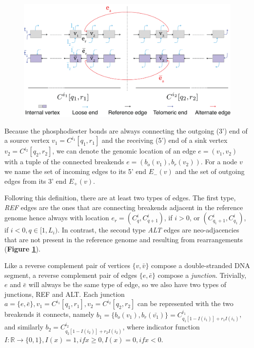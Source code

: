 \documentclass[phd,tocprelim]{cornell}
\renewcommand{\caption}[1]{\singlespacing\hangcaption{#1}\normalspacing}
\begin{document}
\begin{figure}[h!]
    \centering
    \includegraphics[width=0.95\linewidth]{figures/600ppi/ggraph_schematic.png}
    \caption{Schematic of a genome graph}
    \label{fig:ggraph_schematic}
\end{figure}

Because the phosphodiester bonds are always connecting the outgoing (3') end of a source vertex $v_1 = C^{i_1}[q_1,r_1]$ and the receiving (5') end of a sink vertex $v_2 = C^{i_2}[q_2,r_2]$, we can denote the genomic location of an edge $e = (v_1, v_2)$ with a tuple of the connected breakends $e = (b_o(v_1), b_r(v_2))$. For a node $v$ we name the set of incoming edges to its 5' end $E_{-}(v)$ and the set of outgoing edges from its 3' end $E_{+}(v)$.

Following this definition, there are at least two types of edges. The first type, \textit{REF} edges are the ones that are connecting breakends adjacent in the reference genome hence always with location $e_r = (C^{i}_{q}, C^{i}_{q + 1})$, if $i>0$, or $(C^{i}_{q_1 + 1}, C^{i}_{q_1})$, if $i<0, q \in [1,L_i)$. In contrast, the second type \textit{ALT} edges are neo-adjacencies that are not present in the reference genome and resulting from rearrangements (\textbf{Figure \ref{fig:ggraph_schematic}}).

Like a reverse complement pair of vertices $\{v, \bar{v}\}$ compose a double-stranded DNA segment, a reverse complement pair of edges $\{e, \bar{e}\}$ compose a \textit{junction}. Trivially, $e$ and $\bar{e}$ will always be the same type of edge, so we also have two types of junctions, REF and ALT. Each junction $a = \{e, \bar{e}\}, v_1 = C^{i_1}[q_1,r_1], v_2 = C^{i_2}[q_2,r_2]$ can be represented with the two breakends it connects, namely $b_1 = \{b_o(v_1), b_r(\bar{v_1})\} = C^{i_1}_{q_1 [1-I(i_1)] + r_1 I(i_1)}$, and similarly $b_2 = C^{i_2}_{q_2 [1-I(i_2)] + r_2 I(i_2)}$, where indicator function $I:\mathbb{R}\rightarrow \{0, 1\}, I(x)=1, if x \ge 0, I(x) = 0, if x<0$.
\end{document}
